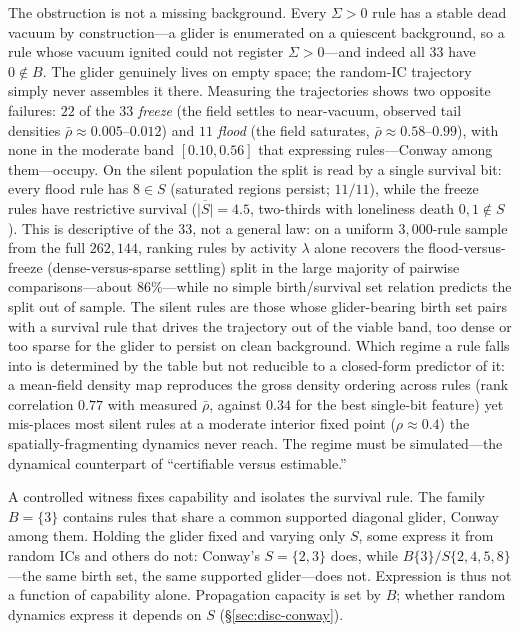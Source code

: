 \documentclass{article}
\begin{document}
The obstruction is not a missing background. Every $\Sigma>0$ rule has a stable
dead vacuum by construction---a glider is enumerated on a quiescent background, so
a rule whose vacuum ignited could not register $\Sigma>0$---and indeed all $33$
have $0\notin B$. The glider genuinely lives on empty space; the random-IC
trajectory simply never assembles it there. Measuring the trajectories shows two
opposite failures: $22$ of the $33$ \emph{freeze} (the field settles to
near-vacuum, observed tail densities $\bar\rho\approx0.005$--$0.012$) and $11$
\emph{flood} (the field saturates, $\bar\rho\approx0.58$--$0.99$), with none in
the moderate band $[0.10,0.56]$ that expressing rules---Conway among them---occupy.
On the silent population the split is read by a single survival bit: every flood
rule has $8\in S$ (saturated regions persist; $11/11$), while the freeze rules
have restrictive survival ($\overline{|S|}=4.5$, two-thirds with loneliness death
$0,1\notin S$). This is descriptive of the $33$, not a general law: on a uniform
$3{,}000$-rule sample from the full $262{,}144$, ranking rules by activity
$\lambda$ alone recovers the flood-versus-freeze (dense-versus-sparse
settling) split in the large majority of pairwise comparisons---about
$86\%$---while no simple birth/survival set relation predicts the split
out of sample. The silent rules are those
whose glider-bearing birth set pairs with a survival rule that drives the
trajectory out of the viable band, too dense or too sparse for the glider to
persist on clean background. Which regime a rule falls into is determined by the
table but not reducible to a closed-form predictor of it: a mean-field density map
reproduces the gross density ordering across rules (rank correlation $0.77$ with
measured $\bar\rho$, against $0.34$ for the best single-bit feature) yet
mis-places most silent rules at a moderate interior fixed point
($\rho\approx0.4$) the spatially-fragmenting dynamics never reach. The regime must
be simulated---the dynamical counterpart of ``certifiable versus estimable.''

A controlled witness fixes capability and isolates the survival rule. The family
$B=\{3\}$ contains rules that share a common supported diagonal glider, Conway
among them. Holding the glider fixed and varying only $S$, some express it from
random ICs and others do not: Conway's $S=\{2,3\}$ does, while
$B\{3\}/S\{2,4,5,8\}$---the same birth set, the same supported glider---does not.
Expression is thus not a function of capability alone. Propagation capacity is set
by $B$; whether random dynamics express it depends on $S$ (\S\ref{sec:disc-conway}).
\end{document}
